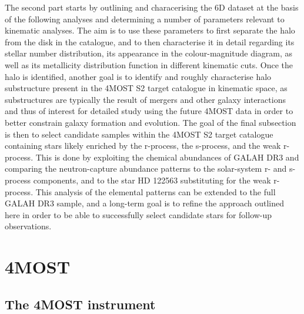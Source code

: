 \documentclass[a4paper,11pt]{article}
\begin{document}
The second part starts by outlining and characerising the 6D dataset at the basis of the following analyses and determining a number of parameters relevant to kinematic analyses. The aim is to use these parameters to first separate the halo from the disk in the catalogue, and to then characterise it in detail regarding its stellar number distribution, its appearance in the colour-magnitude diagram, as well as its metallicity distribution function in different kinematic cuts. Once the halo is identified, another goal is to identify and roughly characterise halo substructure present in the 4MOST S2 target catalogue in kinematic space, as substructures are typically the result of mergers and other galaxy interactions \citep[e.g.,][]{helmi20} and thus of interest for detailed study using the future 4MOST data in order to better constrain galaxy formation and evolution. The goal of the final subsection is then to select candidate samples within the 4MOST S2 target catalogue containing stars likely enriched by the r-process, the s-process, and the weak r-process. This is done by exploiting the chemical abundances of GALAH DR3 and comparing the neutron-capture abundance patterns to the solar-system r- and s-process components, and to the star HD 122563 \citep{honda06} substituting for the weak r-process. This analysis of the elemental patterns can be extended to the full GALAH DR3 sample, and a long-term goal is to refine the approach outlined here in order to be able to successfully select candidate stars for follow-up observations.
%
%
%
%
%
\clearpage
\section{4MOST} \label{4most}
\subsection{The 4MOST instrument} \label{instrum}
\end{document}
